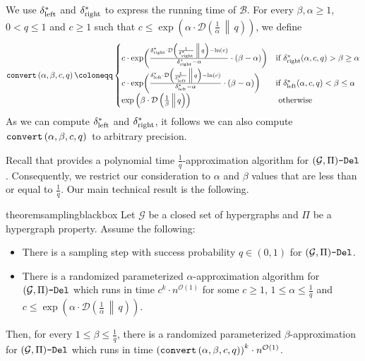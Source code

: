 \documentclass[letterpaper,11pt]{article}
\newcommand{\1}[1]{\mathds{1}\left[#1\right]}
\newcommand{\runtime}[1][\alpha, \beta, c, q]{\textnormal{\texttt{convert}}\left(#1\right)}
\newcommand{\D}[2]{\mathcal{D}\left(#1\, \middle\|\,#2 \right)}
\newcommand{\Oh}{\mathcal{O}}
\newcommand{\sgpivd}[1][\mathcal{G},\Pi]{(#1)\textnormal{\texttt{-Del}}}
\newcommand{\cG}{\mathcal{G}}
\newcommand{\sdeltal}{\delta^{*}_{\textnormal{left}}}
\newcommand{\sdeltar}{\delta^{*}_{\textnormal{right}}}
\begin{document}
We use $\sdeltal$ and $\sdeltar$ to express the running time of $\mathcal{B}$.
For every $\beta,\alpha \geq 1$, $0< q \leq 1$ and $c\geq 1$ such that $c\leq \exp\left(\alpha \cdot \D{\frac{1}{\alpha}}{q}\right)$, we define
	\begin{equation}
		\label{eq:runtime}
		\runtime \coloneqq \begin{cases}
			c \cdot \exp\biggl(\frac{ \sdeltar \cdot \D{\frac{1}{\sdeltar}}{q}- \ln(c) }{\sdeltar - \alpha} \cdot \left( \beta - \alpha \right) \biggr) &\text{if } \sdeltar(\alpha, c, q) > \beta \geq\alpha\\ 
			c \cdot \exp\biggl(\frac{\sdeltal \cdot \D{\frac{1}{\sdeltal}}{q}- \ln(c) }{\sdeltal - \alpha} \cdot \left( \beta - \alpha \right) \biggr) &\text{if } \sdeltal(\alpha, c, q) < \beta \leq \alpha\\
			\exp\left(\beta\cdot \D{\frac{1}{\beta}}{q}\right) &\textnormal{ otherwise}
		\end{cases}
	\end{equation}
	As we can compute $\sdeltal$ and $\sdeltar$, it follows we can also compute $\runtime{}$ to arbitrary precision.
	
Recall that  provides a polynomial time $\frac{1}{q}$-approximation algorithm for $\sgpivd$. Consequently, we restrict our consideration to $\alpha$ and $\beta$ values that are less than or equal to $\frac{1}{q}$. Our main technical result is the following.
\begin{restatable}{theorem}{samplingblackbox}\label{theorem:summary_sampling_step}
	Let $\cG$ be a closed set of hypergraphs and $\Pi$ be a hypergraph property.
	Assume the following:
	\begin{itemize}
		\item There is a sampling step with success probability $q\in(0,1)$ for $\sgpivd$.
		\item There is a randomized parameterized $\alpha$-approximation algorithm for $\sgpivd$ which runs in time $c^{k}\cdot n^{\Oh(1)}$ for some $c \geq 1$, $1 \leq \alpha \leq \frac{1}{q}$ and $c\leq \exp\left(\alpha \cdot \D{\frac{1}{\alpha}}{q} \right)$. 
	\end{itemize}
Then, for every $1\leq \beta\leq \frac{1}{q}$, there is a randomized parameterized $\beta$-approximation for $\sgpivd$ which runs in time $\left( \runtime\right)^{k} \cdot n^{\Oh(1)}$.
\end{restatable}
\end{document}
